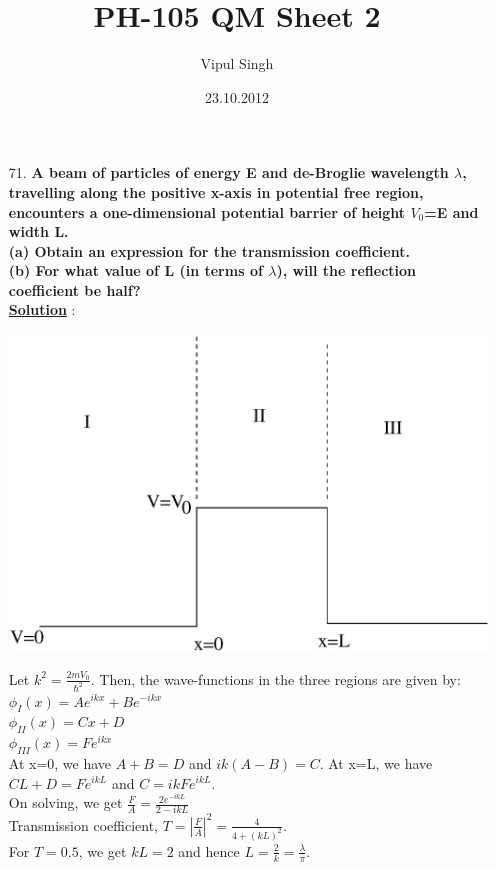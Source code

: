 \documentclass[10pt, a4paper]{article}
\begin{document}
\title{PH-105 QM Sheet 2}
\date{23.10.2012}
\author{Vipul Singh}
\maketitle
\begin{enumerate}
\item[71.]{\bf A beam of particles of energy E and de-Broglie wavelength $\lambda$, travelling along the positive x-axis in potential free region, encounters a one-dimensional potential barrier of height $V_{0}$=E and width L.\\
(a) Obtain an expression for the transmission coefficient.\\
(b) For what value of L (in terms of $\lambda$), will the reflection coefficient be half?}\\

{\underline {\bf Solution}} : \\
\begin{center}
\includegraphics[scale=0.6]{q71.eps}
\end{center}
Let $k^{2}=\frac{2mV_{0}}{\hbar^{2}}$.
Then, the wave-functions in the three regions are given by:\\
$\phi_{I}(x)=Ae^{ikx}+Be^{-ikx}$\\
$\phi_{II}(x)=Cx+D$\\
$\phi_{III}(x)=Fe^{ikx}$\\
At x=0, we have $A+B=D$ and $ik(A-B)=C$. At x=L, we have $CL+D=Fe^{ikL}$ and $C=ikFe^{ikL}$.\\
On solving, we get $\frac{F}{A}=\frac{2e^{-ikL}}{2-ikL}$\\
Transmission coefficient, $T=|\frac{F}{A}|^{2}=\frac{4}{4+(kL)^{2}}$.\\
For $T=0.5$, we get $kL=2$ and hence $L=\frac{2}{k}=\frac{\lambda}{\pi}$.
\end{enumerate}
\end{document}
